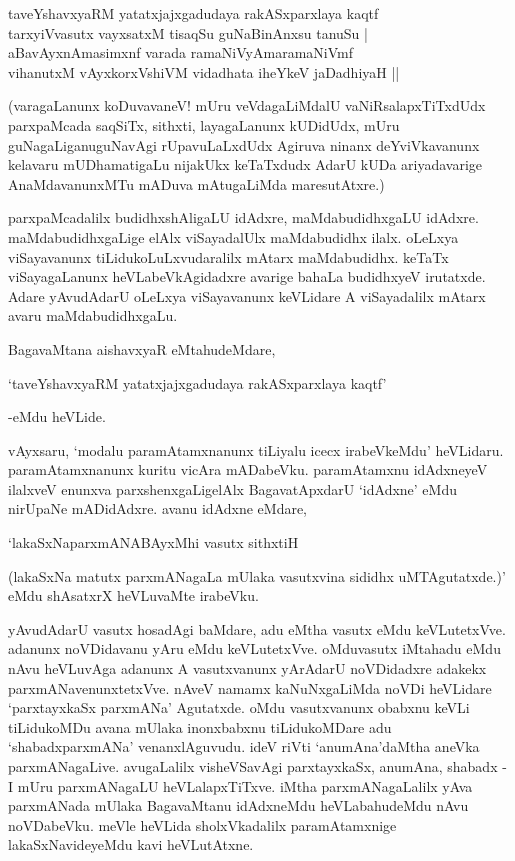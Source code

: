 \begin{shloka}
taveYshavxyaRM yatatxjajxgadudaya rakASxparxlaya kaqtf\\
tarxyiVvasutx vayxsatxM tisaqSu guNaBinAnxsu tanuSu |\\
aBavAyxnAmasimxnf varada ramaNiVyAmaramaNiVmf\\
vihanutxM vAyxkorxVshiVM vidadhata iheYkeV jaDadhiyaH ||
\end{shloka}

(varagaLanunx koDuvavaneV! mUru veVdagaLiMdalU vaNiRsalapxTiTxdUdx parxpaMcada saqSiTx, sithxti, layagaLanunx kUDidUdx, mUru guNagaLiganuguNavAgi rUpavuLaLxdUdx Agiruva ninanx deYviVkavanunx kelavaru mUDhamatigaLu nijakUkx keTaTxdudx AdarU kUDa ariyadavarige AnaMdavanunxMTu mADuva mAtugaLiMda maresutAtxre.)

parxpaMcadalilx budidhxshAligaLU idAdxre, maMdabudidhxgaLU idAdxre. maMdabudidhxgaLige elAlx viSayadalUlx maMdabudidhx ilalx. oLeLxya viSayavanunx tiLidukoLuLxvudaralilx mAtarx maMdabudidhx. keTaTx viSayagaLanunx heVLabeVkAgidadxre avarige bahaLa budidhxyeV irutatxde. Adare yAvudAdarU oLeLxya viSayavanunx keVLidare A viSayadalilx mAtarx avaru maMdabudidhxgaLu.

BagavaMtana aishavxyaR eMtahudeMdare,

\begin{shloka}
`taveYshavxyaRM yatatxjajxgadudaya rakASxparxlaya kaqtf'
\end{shloka}

-eMdu heVLide.

vAyxsaru, `modalu paramAtamxnanunx tiLiyalu icecx irabeVkeMdu' heVLidaru. paramAtamxnanunx kuritu vicAra mADabeVku. paramAtamxnu idAdxneyeV ilalxveV enunxva parxshenxgaLigelAlx BagavatApxdarU `idAdxne' eMdu nirUpaNe mADidAdxre. avanu idAdxne eMdare,

\begin{shloka}
`lakaSxNaparxmANABAyxMhi vasutx sithxtiH
\end{shloka}

(lakaSxNa matutx parxmANagaLa mUlaka vasutxvina sididhx uMTAgutatxde.)' eMdu shAsatxrX heVLuvaMte irabeVku.

yAvudAdarU vasutx hosadAgi baMdare, adu eMtha vasutx eMdu keVLutetxVve. adanunx noVDidavanu yAru eMdu keVLutetxVve. oMdu\break vasutx iMtahadu eMdu nAvu heVLuvAga adanunx A vasutxvanunx yArAdarU noVDidadxre adakekx parxmANavenunxtetxVve. nAveV namamx kaNuNxgaLiMda noVDi heVLi\-dare `parxtayxkaSx parxmANa' Agutatxde. oMdu vasutxvanunx obabxnu keVLi tiLidukoMDu avana mUlaka inonxbabxnu tiLidukoMDare adu `shabadxparxmANa' venanxlAguvudu. ideV riVti `anumAna'daMtha aneVka parxmANagaLive. avugaLalilx visheVSavAgi parxtayxkaSx, anumAna, shabadx - I mUru parxmANagaLU heVLalapxTiTxve. iMtha parxmANagaLalilx yAva parxmANada mUlaka BagavaMtanu idAdxneMdu heVLabahudeMdu nAvu noVDabeVku. meVle heVLida sholxVkadalilx paramAtamxnige lakaSxNavideyeMdu kavi heVLutAtxne.

